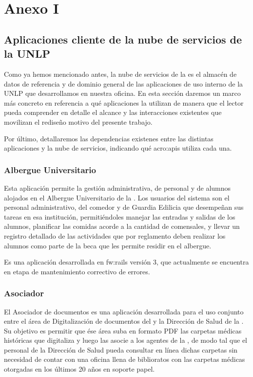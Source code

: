 \section{Anexo I}
\label{anexo:detalle-clientes}

\subsection{Aplicaciones cliente de la nube de servicios de la UNLP}

Como ya hemos mencionado antes, la nube de servicios de la \unlp es el almacén de datos de referencia y de dominio general de las aplicaciones de uso interno de la UNLP que desarrollamos en nuestra oficina. En esta sección daremos un marco más concreto en referencia a qué aplicaciones la utilizan de manera que el lector pueda comprender en detalle el alcance y las interacciones existentes que movilizan el rediseño motivo del presente trabajo.

Por último, detallaremos las dependencias existenes entre las distintas aplicaciones y la nube de servicios, indicando qué \glspl{acro:api} utiliza cada una.


\subsubsection{Albergue Universitario}
\label{anexo:detalle-clientes:albergue}

Esta aplicación permite la gestión administrativa, de personal y de alumnos alojados en el Albergue Universitario de la \unlp. Los usuarios del sistema son el personal administrativo, del comedor y de Guardia Edilicia que desempeñan sus tareas en esa institución, permitiéndoles manejar las entradas y salidas de los alumnos, planificar las comidas acorde a la cantidad de comensales, y llevar un registro detallado de las actividades que por reglamento deben realizar los alumnos como parte de la beca que les permite residir en el albergue.

Es una aplicación desarrollada en \gls{fw:rails} versión 3, que actualmente se encuentra en etapa de mantenimiento correctivo de errores.


\subsubsection{Asociador}
\label{anexo:detalle-clientes:asociador}

El Asociador de documentos es una aplicación desarrollada para el uso conjunto entre el área de Digitalización de documentos del \cespi y la Dirección de Salud de la \unlp. Su objetivo es permitir que ése área suba en formato PDF las carpetas médicas históricas que digitaliza y luego las asocie a los agentes de la \unlp, de modo tal que el personal de la Dirección de Salud pueda consultar en línea dichas carpetas sin necesidad de contar con una oficina llena de biblioratos con las carpetas médicas otorgadas en los últimos 20 años en soporte papel.

